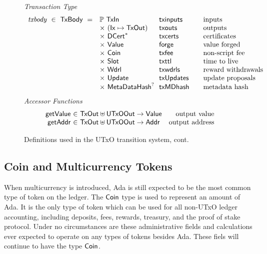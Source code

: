 \begin{figure*}[htb]
  \emph{Transaction Type}
  \begin{equation*}
    \begin{array}{r@{~~}l@{~~}l@{\qquad}l}
      \var{txbody} ~\in~ \TxBody ~=~
      & \powerset{\TxIn} & \fun{txinputs}& \text{inputs}\\
      &\times ~(\Ix \mapsto \TxOut) & \fun{txouts}& \text{outputs}\\
      & \times~ \seqof{\DCert} & \fun{txcerts}& \text{certificates}\\
       & \times ~\Value  & \fun{forge} &\text{value forged}\\
       & \times ~\Coin & \fun{txfee} &\text{non-script fee}\\
       & \times ~\Slot & \fun{txttl} & \text{time to live}\\
       & \times~ \Wdrl  & \fun{txwdrls} &\text{reward withdrawals}\\
       & \times ~\Update  & \fun{txUpdates} & \text{update proposals}\\
       & \times ~\MetaDataHash^? & \fun{txMDhash} & \text{metadata hash}\\
    \end{array}
  \end{equation*}
  \emph{Accessor Functions}
  \begin{equation*}
    \begin{array}{r@{~\in~}lr}
      \fun{getValue} & \TxOut \uniondistinct \UTxOOut \to \Value & \text{output value} \\
      \fun{getAddr} & \TxOut \uniondistinct \UTxOOut \to \Addr & \text{output address} \\
    \end{array}
  \end{equation*}
  \caption{Definitions used in the UTxO transition system, cont.}
  \label{fig:defs:utxo-shelley-2}
\end{figure*}

\subsection*{Coin and Multicurrency Tokens}
When multicurrency is introduced, Ada is still expected to be
the most common type of token on the ledger.
The $\mathsf{Coin}$ type is used to represent an amount of Ada.
It is the only
type of token which can be used for all non-UTxO ledger accounting, including deposits,
fees, rewards, treasury, and the proof of stake protocol. Under no circumstances
are these administrative fields and calculations ever expected to operate on
any types of tokens besides Ada. These fiels will continue to have the type $\mathsf{Coin}$.

